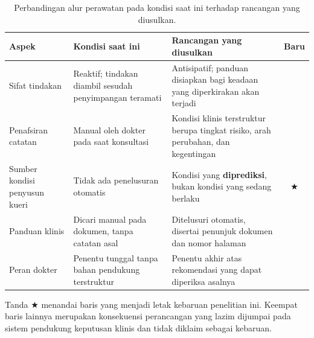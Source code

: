 \begin{table}[htbp]
\centering
\caption{Perbandingan alur perawatan pada kondisi saat ini terhadap rancangan yang diusulkan.}
\label{tab:before-after}
\begin{tabular}{@{}>{\raggedright\arraybackslash\hyphenpenalty=10000}p{2.6cm}>{\raggedright\arraybackslash\hyphenpenalty=10000}p{4.4cm}>{\raggedright\arraybackslash\hyphenpenalty=10000}p{4.4cm}c@{}}
\toprule
\textbf{Aspek} & \textbf{Kondisi saat ini} & \textbf{Rancangan yang diusulkan} & \textbf{Baru} \\
\midrule
Sifat tindakan & Reaktif; tindakan diambil sesudah penyimpangan teramati & Antisipatif; panduan disiapkan bagi keadaan yang diperkirakan akan terjadi & \\[3pt]
Penafsiran catatan & Manual oleh dokter pada saat konsultasi & Kondisi klinis terstruktur berupa tingkat risiko, arah perubahan, dan kegentingan & \\[3pt]
Sumber kondisi penyusun kueri & Tidak ada penelusuran otomatis & Kondisi yang \textbf{diprediksi}, bukan kondisi yang sedang berlaku & $\bigstar$ \\[3pt]
Panduan klinis & Dicari manual pada dokumen, tanpa catatan asal & Ditelusuri otomatis, disertai penunjuk dokumen dan nomor halaman & \\[3pt]
Peran dokter & Penentu tunggal tanpa bahan pendukung terstruktur & Penentu akhir atas rekomendasi yang dapat diperiksa asalnya & \\
\bottomrule
\end{tabular}

\vspace{4pt}
\noindent\tabnotestyle Tanda $\bigstar$ menandai baris yang menjadi letak kebaruan penelitian ini. Keempat baris lainnya merupakan konsekuensi perancangan yang lazim dijumpai pada sistem pendukung keputusan klinis dan tidak diklaim sebagai kebaruan.\normalsize
\end{table}
